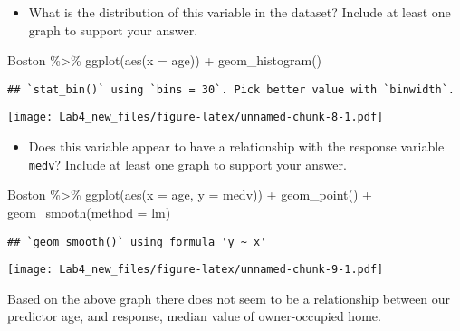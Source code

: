 \documentclass[
]{article}
\newenvironment{Shaded}{\begin{snugshade}}{\end{snugshade}}
\newcommand{\AttributeTok}[1]{\textcolor[rgb]{0.77,0.63,0.00}{#1}}
\newcommand{\FunctionTok}[1]{\textcolor[rgb]{0.00,0.00,0.00}{#1}}
\newcommand{\NormalTok}[1]{#1}
\newcommand{\SpecialCharTok}[1]{\textcolor[rgb]{0.00,0.00,0.00}{#1}}
\providecommand{\tightlist}{%
  \setlength{\itemsep}{0pt}\setlength{\parskip}{0pt}}
\begin{document}
\begin{itemize}
\tightlist
\item
  What is the distribution of this variable in the dataset? Include at
  least one graph to support your answer.
\end{itemize}

\begin{Shaded}
\begin{Highlighting}[]
\NormalTok{Boston }\SpecialCharTok{\%\textgreater{}\%} 
  \FunctionTok{ggplot}\NormalTok{(}\FunctionTok{aes}\NormalTok{(}\AttributeTok{x =}\NormalTok{ age)) }\SpecialCharTok{+}
  \FunctionTok{geom\_histogram}\NormalTok{()}
\end{Highlighting}
\end{Shaded}

\begin{verbatim}
## `stat_bin()` using `bins = 30`. Pick better value with `binwidth`.
\end{verbatim}

\texttt{[image: Lab4\_new\_files/figure-latex/unnamed-chunk-8-1.pdf]}

\begin{itemize}
\tightlist
\item
  Does this variable appear to have a relationship with the response
  variable \texttt{medv}? Include at least one graph to support your
  answer.
\end{itemize}

\begin{Shaded}
\begin{Highlighting}[]
\NormalTok{Boston }\SpecialCharTok{\%\textgreater{}\%} 
  \FunctionTok{ggplot}\NormalTok{(}\FunctionTok{aes}\NormalTok{(}\AttributeTok{x =}\NormalTok{ age, }\AttributeTok{y =}\NormalTok{ medv)) }\SpecialCharTok{+}
  \FunctionTok{geom\_point}\NormalTok{() }\SpecialCharTok{+}
  \FunctionTok{geom\_smooth}\NormalTok{(}\AttributeTok{method =}\NormalTok{ lm)}
\end{Highlighting}
\end{Shaded}

\begin{verbatim}
## `geom_smooth()` using formula 'y ~ x'
\end{verbatim}

\texttt{[image: Lab4\_new\_files/figure-latex/unnamed-chunk-9-1.pdf]}

Based on the above graph there does not seem to be a relationship
between our predictor age, and response, median value of owner-occupied
home.
\end{document}
